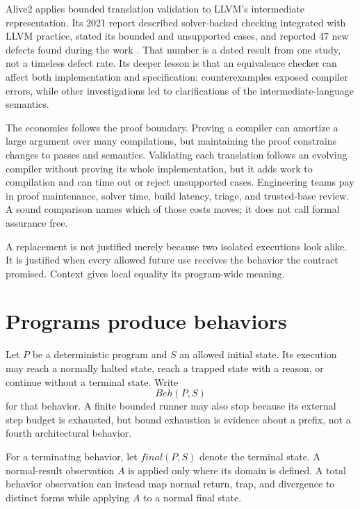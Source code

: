 Alive2 applies bounded translation validation to LLVM's intermediate
representation. Its 2021 report described solver-backed checking integrated
with LLVM practice, stated its bounded and unsupported cases, and reported 47
new defects found during the work \autocite{lopes2021alive2}. That number is a
dated result from one study, not a timeless defect rate. Its deeper lesson is
that an equivalence checker can affect both implementation and specification:
counterexamples exposed compiler errors, while other investigations led to
clarifications of the intermediate-language semantics.

The economics follows the proof boundary. Proving a compiler can amortize a
large argument over many compilations, but maintaining the proof constrains
changes to passes and semantics. Validating each translation follows an
evolving compiler without proving its whole implementation, but it adds work
to compilation and can time out or reject unsupported cases. Engineering teams
pay in proof maintenance, solver time, build latency, triage, and trusted-base
review. A sound comparison names which of those costs moves; it does not call
formal assurance free.

\begin{archive}[title={Optimization is a promise about the future}]
A replacement is not justified merely because two isolated executions look
alike. It is justified when every allowed future use receives the behavior the
contract promised. Context gives local equality its program-wide meaning.
\end{archive}

\section{Programs produce behaviors}

Let \(P\) be a deterministic program and \(S\) an allowed initial state. Its
execution may reach a normally halted state, reach a trapped state with a
reason, or continue without a terminal state. Write
\[
  \mathit{Beh}(P,S)
\]
for that behavior. A finite bounded runner may also stop because its external
step budget is exhausted, but bound exhaustion is evidence about a prefix,
not a fourth architectural behavior.

For a terminating behavior, let \(\mathit{final}(P,S)\) denote the terminal
state. A normal-result observation \(A\) is applied only where its domain is
defined. A total behavior observation can instead map normal return, trap, and
divergence to distinct forms while applying \(A\) to a normal final state.

